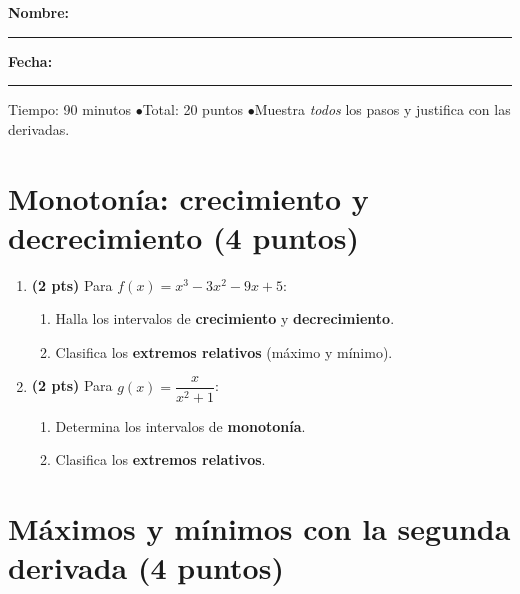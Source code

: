 \documentclass[12pt, letterpaper]{article}
\begin{document}


\vspace{6pt}
\noindent\textbf{Nombre:} \rule{0.5\linewidth}{0.4pt} \quad \textbf{Fecha:} \rule{0.18\linewidth}{0.4pt}

\vspace{2pt}
\noindent\small Tiempo: 90 minutos \quad$\bullet$\quad Total: 20 puntos \quad$\bullet$\quad Muestra \emph{todos} los pasos y justifica con las derivadas.

\vspace{10pt}

\section{Monotonía: crecimiento y decrecimiento (4 puntos)}

\begin{enumerate}[leftmargin=*]
  \item \textbf{(2 pts)} Para $f(x) = x^{3} - 3x^{2} - 9x + 5$:
        \begin{enumerate}[label=\alph*)]
          \item Halla los intervalos de \textbf{crecimiento} y \textbf{decrecimiento}.
          \item Clasifica los \textbf{extremos relativos} (máximo y mínimo).
        \end{enumerate}

  \item \textbf{(2 pts)} Para $g(x) = \dfrac{x}{x^{2} + 1}$:
        \begin{enumerate}[label=\alph*)]
          \item Determina los intervalos de \textbf{monotonía}.
          \item Clasifica los \textbf{extremos relativos}.
        \end{enumerate}
\end{enumerate}

\section{Máximos y mínimos con la segunda derivada (4 puntos)}
\end{document}
